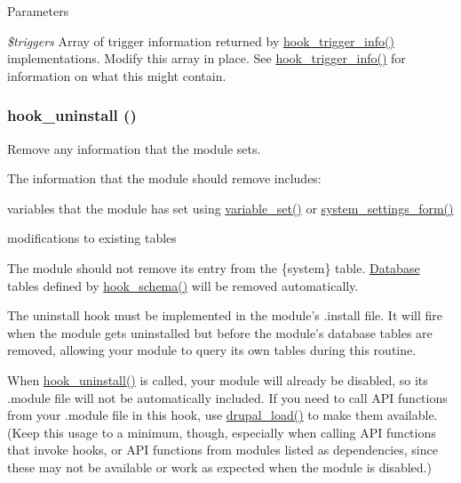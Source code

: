 \begin{DoxyParams}{Parameters}
\item[{\em \$triggers}]Array of trigger information returned by \hyperlink{group__hooks_ga6796483976be1fa22589582444c6fdbb}{hook\_\-trigger\_\-info()} implementations. Modify this array in place. See \hyperlink{group__hooks_ga6796483976be1fa22589582444c6fdbb}{hook\_\-trigger\_\-info()} for information on what this might contain. \end{DoxyParams}
\hypertarget{group__hooks_ga3fb24f6923b3e585d6326ff5abdcc57c}{
\subsubsection[{hook\_\-uninstall}]{\setlength{\rightskip}{0pt plus 5cm}hook\_\-uninstall ()}}
\label{group__hooks_ga3fb24f6923b3e585d6326ff5abdcc57c}
Remove any information that the module sets.

The information that the module should remove includes:
\begin{DoxyItemize}
\item variables that the module has set using \hyperlink{bootstrap_8inc_a9859faa6fcd56ca6048be93dace95999}{variable\_\-set()} or \hyperlink{group__forms_ga6fb270d34465d846cd4659a85d3e40c8}{system\_\-settings\_\-form()}
\item modifications to existing tables
\end{DoxyItemize}

The module should not remove its entry from the \{system\} table. \hyperlink{classDatabase}{Database} tables defined by \hyperlink{group__schemaapi_ga9abd926ddaf68a22e6dca28a25d0c6f5}{hook\_\-schema()} will be removed automatically.

The uninstall hook must be implemented in the module's .install file. It will fire when the module gets uninstalled but before the module's database tables are removed, allowing your module to query its own tables during this routine.

When \hyperlink{group__hooks_ga3fb24f6923b3e585d6326ff5abdcc57c}{hook\_\-uninstall()} is called, your module will already be disabled, so its .module file will not be automatically included. If you need to call API functions from your .module file in this hook, use \hyperlink{bootstrap_8inc_a13a2254228f213a980dc1f09886b8802}{drupal\_\-load()} to make them available. (Keep this usage to a minimum, though, especially when calling API functions that invoke hooks, or API functions from modules listed as dependencies, since these may not be available or work as expected when the module is disabled.)

